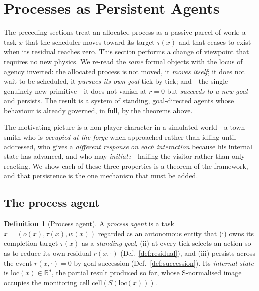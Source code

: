\documentclass[11pt,twocolumn,a4paper]{article}
\theoremstyle{plain}
\theoremstyle{definition}
\newtheorem{definition}[theorem]{Definition}
\theoremstyle{remark}
\newcommand{\R}{\mathbb{R}}
\newcommand{\cell}{\mathrm{cell}}
\newcommand{\Scal}{S}
\begin{document}
\section{Processes as Persistent Agents}
\label{sec:agents}

The preceding sections treat an allocated process as a passive parcel of work: a
task $x$ that the scheduler moves toward its target $\tau(x)$ and that ceases to
exist when its residual reaches zero. This section performs a change of viewpoint
that requires no new physics. We re-read the \emph{same} formal objects with the
locus of agency inverted: the allocated process is not moved, it \emph{moves
itself}; it does not wait to be scheduled, it \emph{pursues its own goal} tick by
tick; and---the single genuinely new primitive---it does not vanish at $r = 0$ but
\emph{succeeds to a new goal} and persists. The result is a system of standing,
goal-directed agents \cite{russell2020} whose behaviour is already governed, in
full, by the theorems above.

The motivating picture is a non-player character in a simulated world---a town
smith who is \emph{occupied at the forge} when approached rather than idling until
addressed, who gives a \emph{different response on each interaction} because his
internal state has advanced, and who may \emph{initiate}---hailing the visitor
rather than only reacting. We show each of these three properties is a theorem of
the framework, and that persistence is the one mechanism that must be added.

\subsection{The process agent}

\begin{definition}[Process agent]
\label{def:agent}
A \emph{process agent} is a task $x = (o(x), \tau(x), w(x))$ regarded as an
autonomous entity that (i) owns its completion target $\tau(x)$ as a \emph{standing
goal}, (ii) at every tick selects an action so as to reduce its own residual
$r(x, \cdot)$ (Def.~\ref{def:residual}), and (iii) persists across the event
$r(x,\cdot) = 0$ by goal succession (Def.~\ref{def:succession}). Its \emph{internal
state} is $\mathrm{loc}(x) \in \R^d$, the partial result produced so far, whose
S-normalised image occupies the monitoring cell $\cell(\Scal(\mathrm{loc}(x)))$.
\end{definition}
\end{document}
